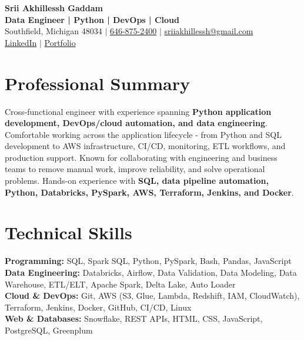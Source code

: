 \documentclass[letterpaper,10pt]{article}
\begin{document}
\fontsize{9.35pt}{10.45pt}\selectfont

\begin{center}
    {\LARGE \textbf{Srii Akhillessh Gaddam}} \\[-1pt]
    \textbf{Data Engineer | Python | DevOps | Cloud} \\[2pt]
    Southfield, Michigan 48034 $|$
    \href{tel:6468752400}{646-875-2400} $|$
    \href{mailto:sriiakhillessh@gmail.com}{sriiakhillessh@gmail.com} \\[1pt]
    \href{https://www.linkedin.com/in/srii-akhiilessh-gaddam-b48668191/}{LinkedIn} $|$
    \href{https://sriiakhillesshg.github.io/portfolio/}{Portfolio}
\end{center}
\vspace{-8pt}

\section{Professional Summary}
\small{Cross-functional engineer with experience spanning \textbf{Python application development, DevOps/cloud automation, and data engineering}. Comfortable working across the application lifecycle - from Python and SQL development to AWS infrastructure, CI/CD, monitoring, ETL workflows, and production support. Known for collaborating with engineering and business teams to remove manual work, improve reliability, and solve operational problems. Hands-on experience with \textbf{SQL, data pipeline automation, Python, Databricks, PySpark, AWS, Terraform, Jenkins, and Docker}.}

\section{Technical Skills}
\small{
\textbf{Programming:} SQL, Spark SQL, Python, PySpark, Bash, Pandas, JavaScript \\
\textbf{Data Engineering:} Databricks, Airflow, Data Validation, Data Modeling, Data Warehouse, ETL/ELT, Apache Spark, Delta Lake, Auto Loader \\
\textbf{Cloud \& DevOps:} Git, AWS (S3, Glue, Lambda, Redshift, IAM, CloudWatch), Terraform, Jenkins, Docker, GitHub, CI/CD, Linux \\
\textbf{Web \& Databases:} Snowflake, REST APIs, HTML, CSS, JavaScript, PostgreSQL, Greenplum
}
\end{document}
